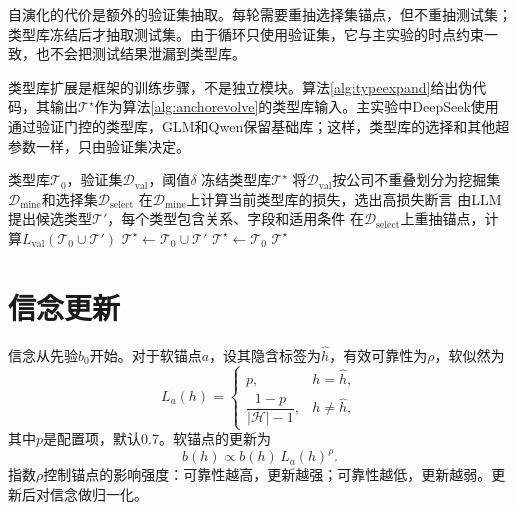 自演化的代价是额外的验证集抽取。每轮需要重抽选择集锚点，但不重抽测试集；类型库冻结后才抽取测试集。由于循环只使用验证集，它与主实验的时点约束一致，也不会把测试结果泄漏到类型库。

类型库扩展是框架的训练步骤，不是独立模块。算法\ref{alg:typeexpand}给出伪代码，其输出$\mathcal T^\star$作为算法\ref{alg:anchorevolve}的类型库输入。主实验中DeepSeek使用通过验证门控的类型库，GLM和Qwen保留基础库；这样，类型库的选择和其他超参数一样，只由验证集决定。

\begin{algorithm}[H]
\caption{类型库的验证集扩展}
\label{alg:typeexpand}
\begin{algorithmic}[1]
\Require 类型库$\mathcal T_0$，验证集$\mathcal D_{\mathrm{val}}$，阈值$\delta$
\Ensure 冻结类型库$\mathcal T^\star$
\State 将$\mathcal D_{\mathrm{val}}$按公司不重叠划分为挖掘集$\mathcal D_{\mathrm{mine}}$和选择集$\mathcal D_{\mathrm{select}}$
\State 在$\mathcal D_{\mathrm{mine}}$上计算当前类型库的损失，选出高损失断言
\State 由LLM提出候选类型$\mathcal T'$，每个类型包含关系、字段和适用条件
\State 在$\mathcal D_{\mathrm{select}}$上重抽锚点，计算$L_{\mathrm{val}}(\mathcal T_0\cup\mathcal T')$
\State $\mathcal T^\star\gets\mathcal T_0\cup\mathcal T'$
\Else
\State $\mathcal T^\star\gets\mathcal T_0$
\EndIf
\State \Return $\mathcal T^\star$ 
\end{algorithmic}
\end{algorithm}


\section{信念更新}

信念从先验$b_0$开始。对于软锚点$a$，设其隐含标签为$\hat h$，有效可靠性为$\rho$，软似然为
\begin{equation}
L_a(h)=
\begin{cases}
p, & h=\hat h,\\
\dfrac{1-p}{|\mathcal H|-1}, & h\ne\hat h,
\end{cases}
\label{eq:softlikelihood}
\end{equation}
其中$p$是配置项，默认0.7。软锚点的更新为
\begin{equation}
b(h)\propto b(h)\,L_a(h)^{\rho}.
\label{eq:softupdate}
\end{equation}
指数$\rho$控制锚点的影响强度：可靠性越高，更新越强；可靠性越低，更新越弱。更新后对信念做归一化。

